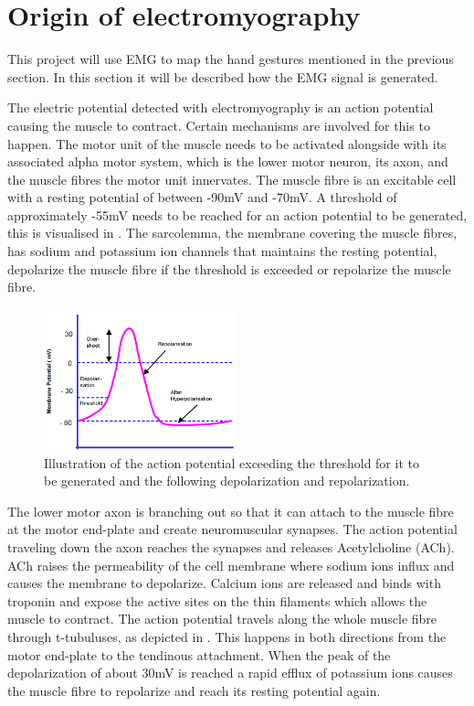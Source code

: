 \section{Origin of electromyography} \label{sec:physiology}
This project will use EMG to map the hand gestures mentioned in the previous section. In this section it will be described how the EMG signal is generated.%

The electric potential detected with electromyography is an action potential causing the muscle to contract. Certain mechanisms are involved for this to happen. The motor unit of the muscle needs to be activated alongside with its associated alpha motor system, which is the lower motor neuron, its axon, and the muscle fibres the motor unit innervates. The muscle fibre is an excitable cell with a resting potential of between -90mV and -70mV. A threshold of approximately -55mV needs to be reached for an action potential to be generated, this is visualised in . The sarcolemma, the membrane covering the muscle fibres, has sodium and potassium ion channels that maintains the resting potential, depolarize the muscle fibre if the threshold is exceeded or repolarize the muscle fibre. \cite{cram2012}


\begin{figure}[H]
	\includegraphics[width=0.5\textwidth]{figures/Anatomy/action_potential}  %
	\caption{Illustration of the action potential exceeding the threshold for it to be generated and the following depolarization and repolarization. \cite{konrad2005}}
	\label{fig:action_potential}  %
\end{figure}

The lower motor axon is branching out so that it can attach to the muscle fibre at the motor end-plate and create neuromuscular synapses. The action potential traveling down the axon reaches the synapses and releases Acetylcholine (ACh). ACh raises the permeability of the cell membrane where sodium ions influx and causes the membrane to depolarize. Calcium ions are released and binds with troponin and expose the active sites on the thin filaments which allows the muscle to contract. The action potential travels along the whole muscle fibre through t-tubuluses, as depicted in . This happens in both directions from the motor end-plate to the tendinous attachment. When the peak of the depolarization of about 30mV is reached a rapid efflux of potassium ions causes the muscle fibre to repolarize and reach its resting potential again. \cite{cram2012}

